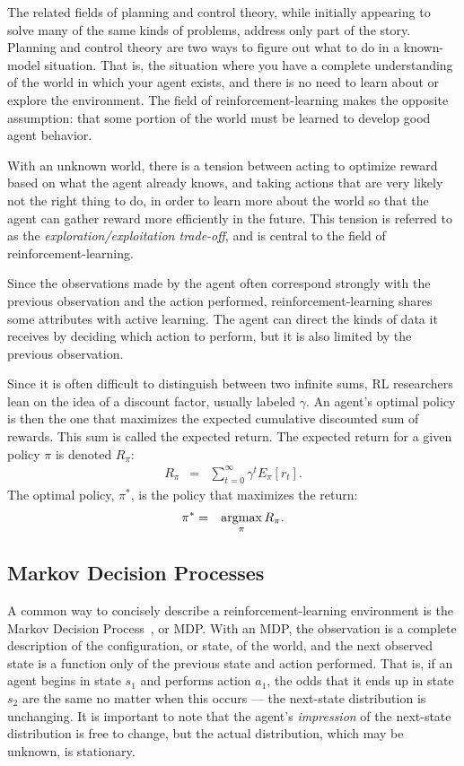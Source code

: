 The related fields of planning and control theory, while initially appearing to solve many of the same kinds of problems, address only part of the story. Planning and control theory are two ways to figure out what to do in a known-model situation. That is, the situation where you have a complete understanding of the world in which your agent exists, and there is no need to learn about or explore the environment. The field of reinforcement-learning makes the opposite assumption: that some portion of the world must be learned to develop good agent behavior.

With an unknown world, there is a tension between acting to optimize reward based on what the agent already knows, and taking actions that are very likely not the right thing to do, in order to learn more about the world so that the agent can gather reward more efficiently in the future. This tension is referred to as the \emph{exploration/exploitation trade-off}, and is central to the field of reinforcement-learning.

Since the observations made by the agent often correspond strongly with the previous observation and the action performed, reinforcement-learning shares some attributes with active learning. The agent can direct the kinds of data it receives by deciding which action to perform, but it is also limited by the previous observation.

Since it is often difficult to distinguish between two infinite sums, RL researchers lean on the idea of a discount factor, usually labeled $\gamma$. An agent's optimal policy is then the one that maximizes the expected cumulative discounted sum of rewards. This sum is called the expected return. The expected return for a given policy $\pi$ is denoted $R_\pi$:
\begin{eqnarray}
R_\pi &=& \sum_{t=0}^\infty \gamma^t E_\pi[r_t].
\end{eqnarray}
The optimal policy, $\pi^*$, is the policy that maximizes the return:
\begin{eqnarray}
\pi^* &=& \argmax_\pi R_\pi.
\end{eqnarray}


\subsection{Markov Decision Processes}

A common way to concisely describe a reinforcement-learning environment is the Markov Decision Process~\cite{puterman1994markov}, or MDP. With an MDP, the observation is a complete description of the configuration, or state, of the world, and the next observed state is a function only of the previous state and action performed. That is, if an agent begins in state $s_1$ and performs action $a_1$, the odds that it ends up in state $s_2$ are the same no matter when this occurs --- the next-state distribution is unchanging. It is important to note that the agent's \emph{impression} of the next-state distribution is free to change, but the actual distribution, which may be unknown, is stationary.

